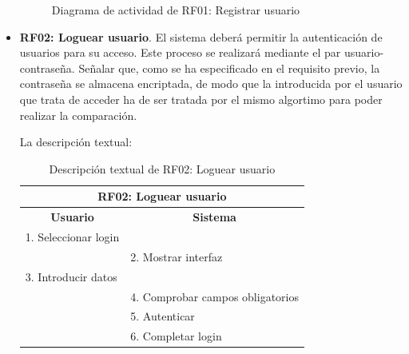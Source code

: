 \begin{itemize}
	\begin{figure}[!htb]
		\centering
		\caption{Diagrama de actividad de RF01: Registrar usuario}
		\label{fig:diagramaActividad_RF01}
	\end{figure}
	 
	\item \textbf{RF02: Loguear usuario}. El sistema deberá permitir la autenticación de usuarios para su acceso. Este proceso se realizará mediante el par usuario-contraseña. Señalar que, como se ha especificado en el requisito previo, la contraseña se almacena encriptada, de modo que la introducida por el usuario que trata de acceder ha de ser tratada por el mismo algortimo para poder realizar la comparación.
	
	La descripción textual:
	
	\begin{table}[h]
		\centering	
		\begin{tabular}{|l|l|}
			\hline
			\multicolumn{2}{|c|}{\textbf{RF02: Loguear usuario}} \\ \hline
			\multicolumn{1}{|c|}{\textbf{Usuario}} & \multicolumn{1}{c|}{\textbf{Sistema}} \\ \hline
			1. Seleccionar login &\\ \hline
			& 2. Mostrar interfaz \\ \hline
			3. Introducir datos &\\ \hline
			& 4. Comprobar campos obligatorios \\ \hline
			& 5. Autenticar \\ \hline
			& 6. Completar login\\ \hline
		\end{tabular}
		\caption{Descripción textual de RF02: Loguear usuario}
		\label{tab:tablaDescTextualRF02}
	\end{table}
	

\end{itemize}
